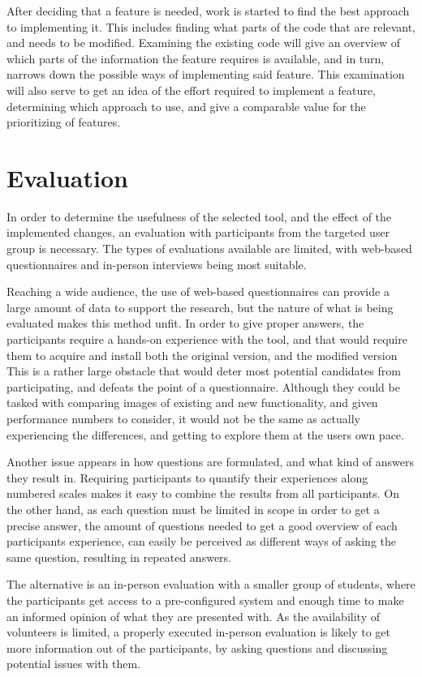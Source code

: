 After deciding that a feature is needed, work is started to find the best approach to implementing it.
This includes finding what parts of the code that are relevant, and needs to be modified.
Examining the existing code will give an overview of which parts of the information the feature requires is available, and in turn, narrows down the possible ways of implementing said feature.
This examination will also serve to get an idea of the effort required to implement a feature, determining which approach to use, and give a comparable value for the prioritizing of features.

\section{Evaluation}\label{methEval}

In order to determine the usefulness of the selected tool, and the effect of the implemented changes, an evaluation with participants from the targeted user group is necessary.
The types of evaluations available are limited, with web-based questionnaires and in-person interviews being most suitable.

Reaching a wide audience, the use of web-based questionnaires can provide a large amount of data to support the research, but the nature of what is being evaluated makes this method unfit.
In order to give proper answers, the participants require a hands-on experience with the tool, and that would require them to acquire and install both the original version, and the modified version
This is a rather large obstacle that would deter most potential candidates from participating, and defeats the point of a questionnaire.
Although they could be tasked with comparing images of existing and new functionality, and given performance numbers to consider, it would not be the same as actually experiencing the differences, and getting to explore them at the users own pace.

Another issue appears in how questions are formulated, and what kind of answers they result in.
Requiring participants to quantify their experiences along numbered scales makes it easy to combine the results from all participants.
On the other hand, as each question must be limited in scope in order to get a precise answer, the amount of questions needed to get a good overview of each participants experience, can easily be perceived as different ways of asking the same question, resulting in repeated answers.

The alternative is an in-person evaluation with a smaller group of students, where the participants get access to a pre-configured system and enough time to make an informed opinion of what they are presented with.
As the availability of volunteers is limited, a properly executed in-person evaluation is likely to get more information out of the participants, by asking questions and discussing potential issues with them.

